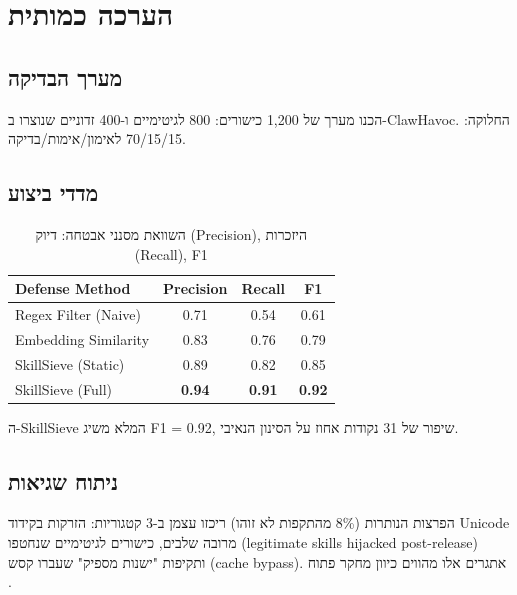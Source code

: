 
\chapter{הערכה כמותית}

\section{מערך הבדיקה}

הכנו מערך של \textenglish{1,200} כישורים: \textenglish{800} לגיטימיים ו-\textenglish{400} זדוניים שנוצרו ב-\textenglish{ClawHavoc}. החלוקה: \textenglish{70/15/15} לאימון/אימות/בדיקה.

\section{מדדי ביצוע}

\begin{table}[H]
\centering
\caption{השוואת מסנני אבטחה: דיוק (\textenglish{Precision}), היזכרות (\textenglish{Recall}), \textenglish{F1}}
\label{tab:security}
\begin{english}
\begin{tabular}{lccc}
\toprule
\textbf{Defense Method} & \textbf{Precision} & \textbf{Recall} & \textbf{F1} \\
\midrule
Regex Filter (Naive)  & 0.71 & 0.54 & 0.61 \\
Embedding Similarity  & 0.83 & 0.76 & 0.79 \\
SkillSieve (Static)   & 0.89 & 0.82 & 0.85 \\
SkillSieve (Full)     & \textbf{0.94} & \textbf{0.91} & \textbf{0.92} \\
\bottomrule
\end{tabular}
\end{english}
\end{table}

ה-\textenglish{SkillSieve} המלא משיג \textenglish{F1 = 0.92}, שיפור של \textenglish{31 נקודות אחוז} על הסינון הנאיבי.

\section{ניתוח שגיאות}

הפרצות הנותרות (\textenglish{8\%} מהתקפות לא זוהו) ריכזו עצמן ב-\textenglish{3} קטגוריות: הזרקות בקידוד \textenglish{Unicode} מרובה שלבים, כישורים לגיטימיים שנחטפו (\textenglish{legitimate skills hijacked post-release}) ותקיפות "ישנות מספיק" שעברו קסש (\textenglish{cache bypass}). אתגרים אלו מהווים כיוון מחקר פתוח \cite{greshake2023indirect}.
